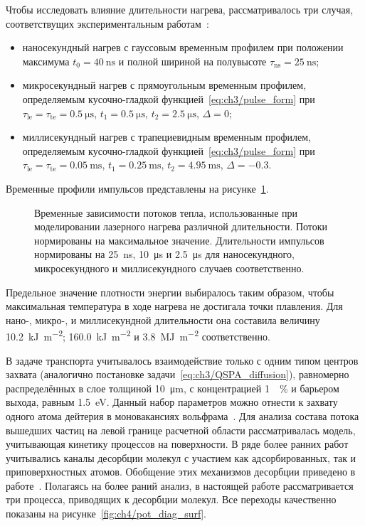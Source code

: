 Чтобы исследовать влияние длительности нагрева, рассматривалось три случая, соответствущих экспериментальным работам~\cite{Zlobinski2019,Zlobinski2020,Gasparyan2021}:
\begin{itemize}
    \item наносекундный нагрев с гауссовым временным профилем при положении максимума \( t_0 = \SI{40}{\nano\second} \) и полной шириной на полувысоте \(\tau_\mathrm{ns}=\SI{25}{\nano\second} \);
    \item микросекундный нагрев с прямоугольным временным профилем, определяемым кусочно-гладкой функцией~\cref{eq:ch3/pulse_form} при \(\tau_\mathrm{le}=\tau_\mathrm{te}=\SI{0.5}{\micro\second}\), \(t_1=\SI{0.5}{\micro\second}\), \( t_2=\SI{2.5}{\micro\second}\), \( \Delta=\num{0} \);
    \item миллисекундный нагрев с трапециевидным временным профилем, определяемым кусочно-гладкой функцией~\cref{eq:ch3/pulse_form} при \(\tau_\mathrm{le}=\tau_\mathrm{te}=\SI{0.05}{\milli\second}\), \(t_1=\SI{0.25}{\milli\second}\), \( t_2=\SI{4.95}{\milli\second}\), \( \Delta=\num{-0.3} \).
\end{itemize}
Временные профили импульсов представлены на рисунке~\cref{fig:ch4/laser_time_profiles}.
\begin{figure}[ht]
    \caption{Временные зависимости потоков тепла, использованные при моделировании лазерного нагрева различной длительности. Потоки нормированы на максимальное значение.  Длительности импульсов нормированы на \SI{25}{\nano\second}, \SI{10}{\micro\second} и \SI{2.5}{\micro\second} для наносекундного, микросекундного и миллисекундного случаев соответственно. }\label{fig:ch4/laser_time_profiles}
\end{figure}
Предельное значение плотности энергии выбиралось таким образом, чтобы максимальная температура в ходе нагрева не достигала точки плавления. Для нано-, микро-, и миллисекундной длительности она составила величину \SI{10,2}{\kilo\joule\per\meter\squared}; \SI{160.0}{\kilo\joule\per\meter\squared} и \SI{3,8}{\mega\joule\per\meter\squared} соответственно.

В задаче транспорта учитывалось взаимодействие только с одним типом центров захвата (аналогично постановке задачи~\cref{eq:ch3/QSPA_diffusion}), равномерно распределённых в слое толщиной \SI{10}{\micro\meter}, с концентрацией \SI{1}{\percent} и барьером выхода, равным \SI{1.5}{\electronvolt}. Данный набор параметров можно отнести к захвату одного атома дейтерия в моновакансиях вольфрама~\cite{Krat2018}. Для анализа состава потока вышедших частиц на левой границе расчетной области рассматривалась модель, учитывающая кинетику процессов на поверхности. В ряде более ранних работ учитывались каналы десорбции молекул с участием как адсорбированных, так и приповерхностных атомов. Обобщение этих механизмов десорбции приведено в работе~\cite{Pisarev1997}. Полагаясь на более раний анализ, в настоящей работе рассматривается три процесса, приводящих к десорбции молекул. Все переходы качественно показаны на рисунке~\cref{fig:ch4/pot_diag_surf}. 

